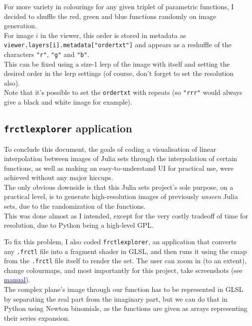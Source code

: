 \documentclass{article}
\begin{document}
For more variety in colourings for any given triplet of parametric functions, I decided to shuffle the red, green and blue functions randomly on image generation. \\
\vspace{2mm}
For image $i$ in the viewer, this order is stored in metadata as \texttt{viewer.layers[i].metadata["ordertxt"]} and appears as a reshuffle of the characters \texttt{"r"}, \texttt{"g"} and \texttt{"b"}. \\
\vspace{2mm}
This can be fixed using a size-1 lerp of the image with itself and setting the desired order in the lerp settings (of course, don't forget to set the resolution also). \\
\vspace{2mm}
Note that it's possible to set the \texttt{ordertxt} with repeats (so \texttt{"rrr"} would always give a black and white image for example).


\subsection{\texttt{frctlexplorer} application}

To conclude this document, the goals of coding a visualisation of linear interpolation between images of Julia sets through the interpolation of certain functions, as well as making an easy-to-understand UI for practical use, were achieved without any major hiccups. \\
\vspace{5mm}
The only obvious downside is that this Julia sets project's sole purpose, on a practical level, is to generate high-resolution images of previously \textit{unseen} Julia sets, due to the randomization of the functions. \\
\vspace{2mm}
This was done almost as I intended, except for the very costly tradeoff of time for resolution, due to Python being a high-level GPL. \\
\vspace{1cm}

To fix this problem, I also coded \texttt{frctlexplorer}, an application that converts any \texttt{.frctl} file into a fragment shader in GLSL, and then runs it using the cmap from the \texttt{.frctl} file itself to render the set. The user can zoom in (to an extent), change colourmaps, and most importantly for this project, take screenshots (see \href{http://chrismzz.github.io/fractal-art/manual.html}{\textcolor{blue}{\underline{manual}}}). \\
\vspace{2mm}
The complex plane's image through our function has to be represented in GLSL by separating the real part from the imaginary part, but we can do that in Python using Newton binomials, as the functions are given as arrays representing their series expansion. \\
\vspace{5mm}
\end{document}
